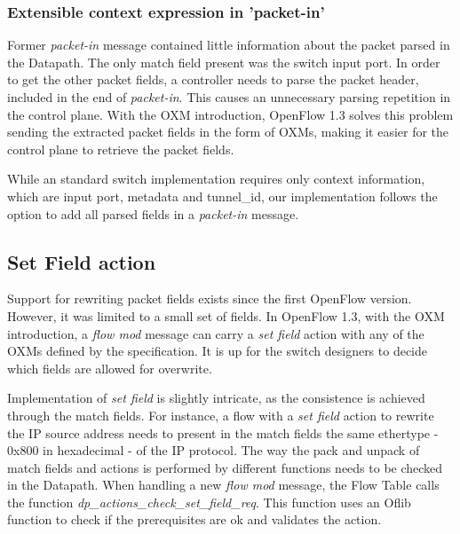     \subsubsection{Extensible context expression in ’packet-in’}
    
    Former \textit{packet-in} message contained little information about the packet parsed in the Datapath. The only match field present was the switch input port. In order to get the other packet fields, a controller needs to parse the packet header, included in the end of \textit{packet-in}. This causes an unnecessary parsing repetition in the control plane. With the OXM introduction, OpenFlow 1.3 solves this problem sending the extracted packet fields in the form of OXMs, making it easier for the control plane to retrieve the packet fields.  
    
    While an standard switch implementation requires only context information, which are input port, metadata and tunnel_id, our implementation follows the option to add all parsed fields in a \textit{packet-in} message.    

\subsection{Set Field action}
\label{sec:sec43}    

Support for rewriting packet fields exists since the first OpenFlow version. However, it was limited to a small set of fields. In OpenFlow 1.3, with the OXM introduction, a \textit{flow mod} message can carry a  \textit{set field} action with any of the OXMs defined by the specification. It is up for the switch designers to decide which fields are allowed for overwrite.   

Implementation of \textit{set field} is slightly intricate, as the consistence is achieved through the match fields. For instance, a flow with a \textit{set field} action to rewrite the IP source address needs to present in the match fields the same ethertype - 0x800 in hexadecimal - of the IP protocol. The way the pack and unpack of match fields and actions is performed by different functions needs to be checked in the Datapath. When handling a new \textit{flow mod} message, the Flow Table calls the function \textit{dp_actions_check_set_field_req}. This function uses an Oflib function to check if the prerequisites are ok and validates the action.

